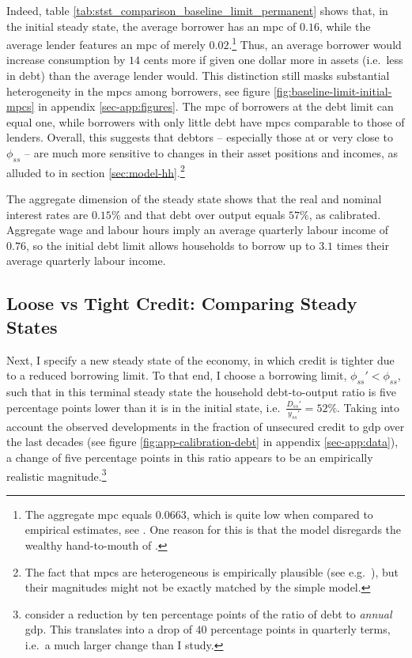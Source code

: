 \documentclass[12pt]{article} %
\numberwithin{equation}{section} %
\numberwithin{figure}{section}
\numberwithin{table}{section}
\begin{document}
Indeed, table \ref{tab:stst_comparison_baseline_limit_permanent} shows that, in the initial steady state, the average borrower has an \Gls{mpc} of $0.16$, while the average lender features an \Gls{mpc} of merely $0.02$.\footnote{The aggregate \Gls{mpc} equals $0.0663$, which is quite low when compared to empirical estimates, see \textcite{kaplan2018}. One reason for this is that the model disregards the wealthy hand-to-mouth of \textcite{kaplan2014}.} Thus, an average borrower would increase consumption by $14$ cents more if given one dollar more in assets (i.e.~less in debt) than the average lender would. This distinction still masks substantial heterogeneity in the \Gls{mpc}s among borrowers, see figure \ref{fig:baseline-limit-initial-mpcs} in appendix \ref{sec-app:figures}. The \Gls{mpc} of borrowers at the debt limit can equal one, while borrowers with only little debt have \Gls{mpc}s comparable to those of lenders. Overall, this suggests that debtors -- especially those at or very close to $\phi_{ss}$ -- are much more sensitive to changes in their asset positions and incomes, as alluded to in section \ref{sec:model-hh}.\footnote{The fact that \Gls{mpc}s are heterogeneous is empirically plausible (see e.g.~\cite{gross2002}), but their magnitudes might not be exactly matched by the simple model.} %

The aggregate dimension of the steady state shows that the real and nominal interest rates are $0.15\%$ and that debt over output equals $57\%$, as calibrated. Aggregate wage and labour hours imply an average quarterly labour income of $0.76$, so the initial debt limit allows households to borrow up to $3.1$ times their average quarterly labour income. 

\subsection{Loose vs Tight Credit: Comparing Steady States}
\label{sec:limit-stst-tight}

Next, I specify a new steady state of the economy, in which credit is tighter due to a reduced borrowing limit. To that end, I choose a borrowing limit, $\phi_{ss}' < \phi_{ss}$, such that in this terminal steady state the household debt-to-output ratio is five percentage points lower than it is in the initial state, i.e.~$\frac{D_{ss}'}{y_{ss}'} = 52\%$. Taking into account the observed developments in the fraction of unsecured credit to \Gls{gdp} over the last decades (see figure \ref{fig:app-calibration-debt} in appendix \ref{sec-app:data}), a change of five percentage points in this ratio appears to be an empirically realistic magnitude.\footnote{\textcite{gl2017} consider a reduction by ten percentage points of the ratio of debt to \textit{annual} \Gls{gdp}. This translates into a drop of $40$ percentage points in quarterly terms, i.e.~a much larger change than I study.} 
\end{document}
